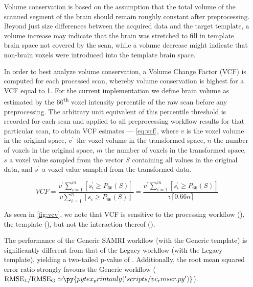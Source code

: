 Volume conservation is based on the assumption that the total volume of the scanned segment of the brain should remain roughly constant after preprocessing.
Beyond just size differences between the acquired data and the target template, a volume increase may indicate that the brain was stretched to fill in template brain space not covered by the scan, while a volume decrease might indicate that non-brain voxels were introduced into the template brain space.

In order to best analyze volume conservation, a Volume Change Factor (VCF) is computed for each processed scan, whereby volume conservation is highest for a VCF equal to 1.
For the current implementation we define brain volume as estimated by the 66\textsuperscript{th} voxel intensity percentile of the raw scan before any preprocessing.
The arbitrary unit equivalent of this percentile threshold is recorded for each scan and applied to all preprocessing workflow results for that particular scan, to obtain VCF esimates
 --- \cref{eq:vcf}, where $v$ is the voxel volume in the original space, $v^\prime$ the voxel volume in the transformed space, $n$ the number of voxels in the original space, $m$ the number of voxels in the transformed space, $s$ a voxel value sampled from the vector $S$ containing all values in the original data, and $s^\prime$ a voxel value sampled from the transformed data.

\begin{equation} \label{eq:vcf}
        V\!C\!F
        = \frac{v^\prime\sum_{i=1}^m [s^\prime_i \geq P_{66}(S)]}{v\sum_{i=1}^n [s_i \geq P_{66}(S)]}
        = \frac{v^\prime\sum_{i=1}^m [s^\prime_i \geq P_{66}(S)]}{v \lceil0.66n\rceil}
\end{equation}

As seen in \cref{fig:vcv}, we note that VCF is sensitive to
the processing workflow (),
the template (),
but not the interaction thereof ().

The performance of the Generic SAMRI workflow (with the Generic template) is significantly different from that of the Legacy workflow (with the Legacy template), yielding a two-tailed p-value of .
Additionally, the root mean squared error ratio strongly favours the Generic workflow
($\mathrm{RMSE_{L}/RMSE_{G}\simeq} \py{pytex_printonly('scripts/vc_rmser.py')}$).


